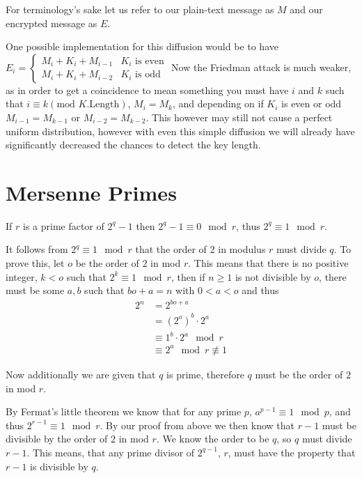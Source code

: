 \documentclass{article}
\begin{document}
	
	For terminology's sake let us refer to our plain-text message as $M$ and our encrypted message as $E$. 
	
	One possible implementation for this diffusion would be to have
	$
	E_i=\begin{cases}
	M_i+K_i+M_{i-1} &K_i\text{ is even}\\
	M_i+K_i+M_{i-2}&K_i \text{ is odd}
	\end{cases}
	$
	Now the Friedman attack is much weaker, as in order to get a coincidence to mean something you must have $i$ and $k$ such that $i\equiv k (\text{mod } K.\text{Length})$, $M_i = M_k$, and depending on if $K_i$ is even or odd $M_{i-1} = M_{k-1}$ or $M_{i-2} = M_{k-2}$. This however may still not cause a perfect uniform distribution, however with even this simple diffusion we will already have significantly decreased the chances to detect the key length.
	
	\section{Mersenne Primes}
	
	 If $r$ is a prime factor of $2^q-1$ then $2^q-1 \equiv 0\mod r$, thus $2^q\equiv 1\mod r$.
	
	 It follows from $2^q \equiv 1 \mod r$ that the order of $2$ in modulus $r$ must divide $q$. To prove this, let $o$ be the order of $2$ in mod $r$. This means that there is no positive integer, $k < o$ such that $2^k\equiv1 \mod r$, then if $n \ge 1$ is not divisible by $o$, there must be some $a,b$ such that $bo+a = n$ with $0<a<o$ and thus 
	\begin{align*}
	2^n&=2^{bo+a}\\
	&= \left(2^o\right)^b\cdot 2^a \\
	&\equiv 1^b\cdot 2^a \mod r \\
	&\equiv 2^a\mod r \not\equiv 1
	\end{align*}
	
	Now additionally we are given that $q$ is prime, therefore $q$ must be the order of $2$ in mod $r$.
	
	 By Fermat's little theorem we know that for any prime $p$, $a^{p-1}\equiv 1\mod p$, and thus $2^{r-1}\equiv 1\mod r$. By our proof from above we then know that $r-1$ must be divisible by the order of $2$ in mod $r$. We know the order to be $q$, so $q$ must divide $r-1$. This means, that any prime divisor of $2^{q-1}$, $r$, must have the property that $r-1$ is divisible by $q$.
	
\end{document}
